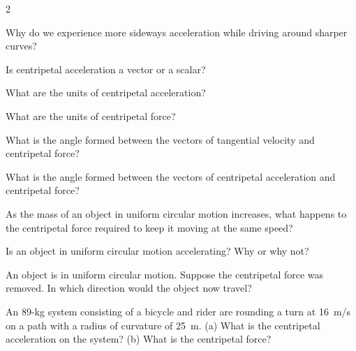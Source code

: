 \documentclass[main.tex]{subfiles}
\begin{document}
\begin{multicols}{2}
\begin{exercise} \label{KB7t4k}
    Why do we experience more sideways acceleration while driving around sharper curves?
\end{exercise}

\begin{exercise} \label{jb3iGO}
    Is centripetal acceleration a vector or a scalar?
\end{exercise}

\begin{exercise} \label{TUxTQh}
    What are the units of centripetal acceleration?
\end{exercise}

\begin{exercise} \label{9YKhPo}
    What are the units of centripetal force?
\end{exercise}

\begin{exercise} \label{wS6Htw}
    What is the angle formed between the vectors of tangential velocity and centripetal force?
\end{exercise}

\begin{exercise} \label{barV9C}
    What is the angle formed between the vectors of centripetal acceleration and centripetal force?
\end{exercise}


\begin{exercise} \label{M6NkHB}
    As the mass of an object in uniform circular motion increases, what happens to the centripetal force required to keep it moving at the same speed?
\end{exercise}

\begin{exercise} \label{IAjJBC}
    Is an object in uniform circular motion accelerating? Why or why not?
\end{exercise}

\begin{exercise} \label{G8I4Up}
    An object is in uniform circular motion. Suppose the centripetal force was removed. In which direction would the object now travel?
\end{exercise}

\begin{exercise} \label{Kv8Old}
An 89-kg system consisting of a bicycle and rider are rounding a turn at \SI{16}{m/s} on a path with a radius of curvature of \SI{25}{m}. (a) What is the centripetal acceleration on the system? (b) What is the centripetal force?
\end{exercise}


\end{multicols}
\end{document}
